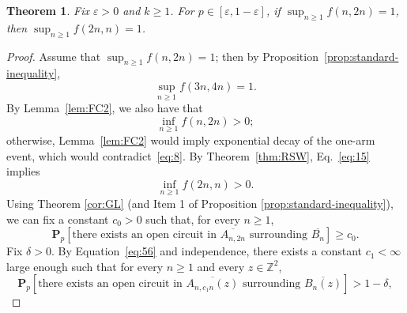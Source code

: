 \documentclass[12pt, twoside,a4paper,reqno]{amsart}
\theoremstyle{plain}
\newtheorem{theorem}{Theorem}[section]
\theoremstyle{remark}
\theoremstyle{definition}
\newcommand{\eps}{\varepsilon}
\newcommand{\PP}{\mathbf{P}}
\newcommand{\Pp}[1]{\PP_p \left [ #1 \right ]}
\newcommand{\cal}{\mathcal}
\newcommand{\ol}{\overline}
\renewcommand{\bar}{\overline}
\begin{document}
\begin{theorem}\label{thm:RSWhp}
  Fix $\eps>0$ and $k\ge1$. For $p \in [\eps, 1-\eps]$, if $\displaystyle\sup_{n\ge1}{f(n,2n)}=1$, then
  $\displaystyle\sup_{n\ge1}{f(2n,n)}=1$.
\end{theorem}

\begin{proof}
  Assume that $\sup_{n\ge 1}f(n,2n) =1$; then by
  Proposition~\ref{prop:standard-inequality},
  \begin{equation}
    \label{eq:8}
    \sup_{n\ge1} f(3n,4n)=1.
  \end{equation}
  By Lemma~\ref{lem:FC2}, we also have that
  \begin{equation}
    \label{eq:15}
    \inf_{n\ge1}f(n,2n)>0;
  \end{equation}
  otherwise, Lemma~\ref{lem:FC2} would imply exponential decay of the one-arm event,
  which would contradict~\eqref{eq:8}. By Theorem~\ref{thm:RSW}, Eq.~\eqref{eq:15}
  implies
  \begin{equation}
    \inf_{n\ge 1}f(2n,n)>0.\label{eq:16}
\end{equation}
Using Theorem \ref{cor:GL} (and Item 1 of Proposition \ref{prop:standard-inequality}), we can fix a constant $c_0>0$ such
that, for every $n\ge1$,
\begin{equation}
  \mathbf P_p [ \text{there exists an open circuit in
    $\ol{A_{n,2n}}$ surrounding $\ol{B_n}$} ]\ge c_0.\label{eq:56}
\end{equation}
Fix $\delta>0$. By Equation~\eqref{eq:56} and independence, there exists a
constant $c_1<\infty$ large enough such that for every $n\ge 1$ and every $z\in
\mathbb Z^2$,
\begin{equation}
  \label{eq:17}
  \Pp{\text{there exists an open circuit in
    $\ol{A_{n,c_1 n}(z)}$ surrounding $\ol{B_n(z)}$}}>1-\delta,
\end{equation}


\end{proof}
\end{document}
